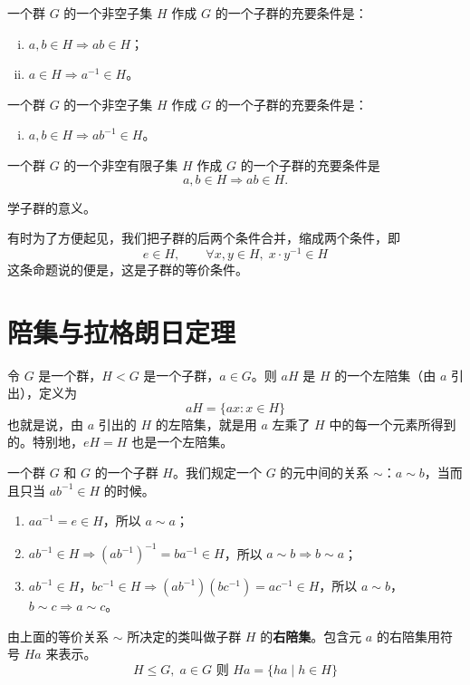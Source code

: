 \begin{theorem}[定理 1：子群充要条件]
一个群 $G$ 的一个非空子集 $H$ 作成 $G$ 的一个子群的充要条件是：
\begin{enumerate}[(i)]
  \item $a,b\in H\Rightarrow ab\in H$；
  \item $a\in H\Rightarrow a^{-1}\in H$。
\end{enumerate}
\end{theorem}

\begin{theorem}[定理 2：子群充要条件]
一个群 $G$ 的一个非空子集 $H$ 作成 $G$ 的一个子群的充要条件是：
\begin{enumerate}[(iii)]
  \item $a,b\in H\Rightarrow ab^{-1}\in H$。
\end{enumerate}
\end{theorem}

\begin{theorem}[定理 3：非空有限子群]
一个群 $G$ 的一个非空有限子集 $H$ 作成 $G$ 的一个子群的充要条件是
\[
a,b\in H\Rightarrow ab\in H.
\]
\end{theorem}

\begin{note}[学子群的意义]
学子群的意义。
\end{note}

\begin{proposition}[命题 1.11]
有时为了方便起见，我们把子群的后两个条件合并，缩成两个条件，即
\[
e\in H,\qquad\forall x,y\in H,\;x\cdot y^{-1}\in H
\]
这条命题说的便是，这是子群的等价条件。
\end{proposition}

\section{陪集与拉格朗日定理}

\begin{definition}[左陪集（定义 1.27）]
令 $G$ 是一个群，$H<G$ 是一个子群，$a\in G$。则 $aH$ 是 $H$ 的一个左陪集（由 $a$ 引出），定义为
\[
aH=\{ax:x\in H\}
\]
也就是说，由 $a$ 引出的 $H$ 的左陪集，就是用 $a$ 左乘了 $H$ 中的每一个元素所得到的。特别地，$eH=H$ 也是一个左陪集。
\end{definition}

\begin{definition}[右陪集]
一个群 $G$ 和 $G$ 的一个子群 $H$。我们规定一个 $G$ 的元中间的关系 $\sim$：$a\sim b$，当而且只当 $ab^{-1}\in H$ 的时候。
\begin{enumerate}
  \item $aa^{-1}=e\in H$，所以 $a\sim a$；
  \item $ab^{-1}\in H\Rightarrow(ab^{-1})^{-1}=ba^{-1}\in H$，所以 $a\sim b\Rightarrow b\sim a$；
  \item $ab^{-1}\in H$，$bc^{-1}\in H\Rightarrow(ab^{-1})(bc^{-1})=ac^{-1}\in H$，所以 $a\sim b$，$b\sim c\Rightarrow a\sim c$。
\end{enumerate}
由上面的等价关系 $\sim$ 所决定的类叫做子群 $H$ 的\textbf{右陪集}。包含元 $a$ 的右陪集用符号 $Ha$ 来表示。
\[
H\le G,\;a\in G\text{ 则 }Ha=\{ha\mid h\in H\}
\]
\end{definition}

